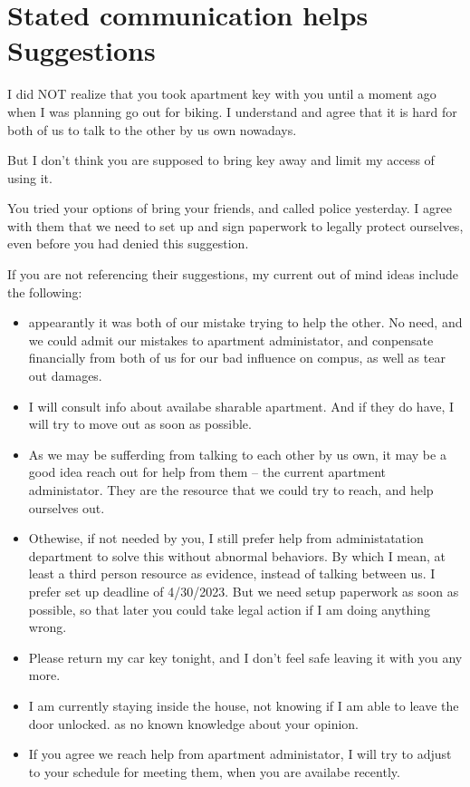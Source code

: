 \documentclass[9pt, b5paper]{article}
\begin{document}
\section{Stated communication helps Suggestions}
\label{sec-7}
I did NOT realize that you took apartment key with you until a moment ago when I was planning go out for biking. I understand and agree that it is hard for both of us to talk to the other by us own nowadays. 

But I don't think you are supposed to bring key away and limit my access of using it. 

You tried your options of bring your friends, and called police yesterday. I agree with them that we need to set up and sign paperwork to legally protect ourselves, even before you had denied this suggestion. 

If you are not referencing their suggestions, my current out of mind ideas include the following: 

\begin{itemize}
\item appearantly it was both of our mistake trying to help the other. No need, and we could admit our mistakes to apartment administator, and conpensate financially from both of us for our bad influence on compus, as well as tear out damages.

\item I will consult info about availabe sharable apartment. And if they do have, I will try to move out as soon as possible.

\item As we may be sufferding from talking to each other by us own, it may be a good idea reach out for help from them -- the current apartment administator. They are the resource that we could try to reach, and help ourselves out.

\item Othewise, if not needed by you, I still prefer help from administatation department to solve this without abnormal behaviors. By which I mean, at least a third person resource as evidence, instead of talking between us. I prefer set up deadline of 4/30/2023. But we need setup paperwork as soon as possible, so that later you could take legal action if I am doing anything wrong.

\item Please return my car key tonight, and I don't feel safe leaving it with you any more.

\item I am currently staying inside the house, not knowing if I am able to leave the door unlocked. as no known knowledge about your opinion.

\item If you agree we reach help from apartment administator, I will try to adjust to your schedule for meeting them, when you are availabe recently.
\end{itemize}
\end{document}
